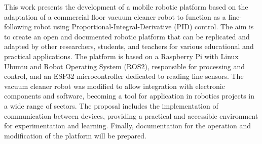 
This work presents the development of a mobile robotic platform based on the adaptation of a commercial floor vacuum cleaner robot to function as a line-following robot using Proportional-Integral-Derivative (PID) control. The aim is to create an open and documented robotic platform that can be replicated and adapted by other researchers, students, and teachers for various educational and practical applications. The platform is based on a Raspberry Pi with Linux Ubuntu and Robot Operating System (ROS2), responsible for processing and control, and an ESP32 microcontroller dedicated to reading line sensors. The vacuum cleaner robot was modified to allow integration with electronic components and software, becoming a tool for application in robotics projects in a wide range of sectors. The proposal includes the implementation of communication between devices, providing a practical and accessible environment for experimentation and learning. Finally, documentation for the operation and modification of the platform will be prepared.


